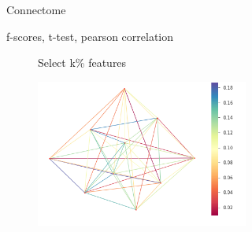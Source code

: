 \documentclass[msthesis.tex]{subfiles}
\begin{document}
\begin{figure}
\begin{subfigure}[b]{0.4\textwidth}
         \caption{Connectome}
         \label{fig:connectivity_matrix}
        \end{subfigure}
    \vfill
        \begin{subfigure}[b]{0.6\textwidth}
         \centering
         \vspace{2em}
        \begin{tcolorbox}[box align= center,coltitle=black!75!black, colback=yellow!5!white,colframe=yellow!50!black,
  colbacktitle=yellow!80!black,title=\centering \large Feature Representation]
        \centering
        f-scores, t-test, pearson correlation
        \end{tcolorbox}
        \caption{}
         \label{fig:feature extraction}
         \end{subfigure}
    \vfill
    \begin{subfigure}[b]{0.9\textwidth}
    \begin{subfigure}[b]{0.3\textwidth}
        \begin{tcolorbox}[coltitle=black!60!black ,colback=yellow!5!white,colframe=yellow!50!black,
  colbacktitle=yellow!75!black, fontupper=\color{black}, title=\centering \large Feature Selection]
        Select k\% features
        \end{tcolorbox}
         \vspace{+1.5cm}
         \label{fig:feature selection}
         \end{subfigure}
    \hfill
    \begin{subfigure}[b]{0.4\textwidth}
         \centering
         \includegraphics[height =0.8\textwidth,width=\textwidth]{images/mews.png}

\end{subfigure}
\end{subfigure}
\end{figure}
\end{document}
